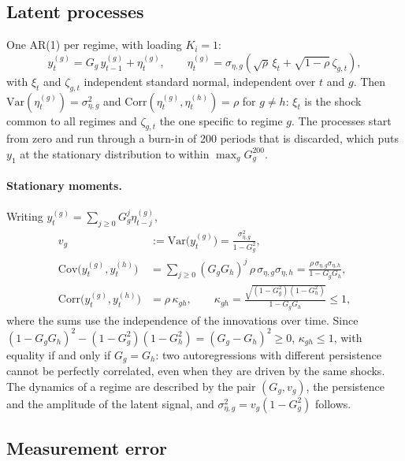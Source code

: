 \documentclass[11pt]{article}
\newcommand{\Var}{\mathrm{Var}}
\newcommand{\Cov}{\mathrm{Cov}}
\newcommand{\Corr}{\mathrm{Corr}}
\begin{document}
\subsection{Latent processes}

One AR(1) per regime, with loading $K_i = 1$:
\begin{equation}\label{eq:latent}
  y^{(g)}_t = G_g\, y^{(g)}_{t-1} + \eta^{(g)}_t, \qquad
  \eta^{(g)}_t = \sigma_{\eta,g}\left(\sqrt{\rho}\,\xi_t + \sqrt{1-\rho}\,\zeta_{g,t}\right),
\end{equation}
with $\xi_t$ and $\zeta_{g,t}$ independent standard normal, independent over $t$ and $g$. Then $\Var(\eta^{(g)}_t) = \sigma^2_{\eta,g}$ and $\Corr(\eta^{(g)}_t, \eta^{(h)}_t) = \rho$ for $g \neq h$: $\xi_t$ is the shock common to all regimes and $\zeta_{g,t}$ the one specific to regime $g$. The processes start from zero and run through a burn-in of 200 periods that is discarded, which puts $y_1$ at the stationary distribution to within $\max_g G_g^{200}$.

\paragraph{Stationary moments.} Writing $y^{(g)}_t = \sum_{j \ge 0} G_g^j \eta^{(g)}_{t-j}$,
\begin{align}
  v_g &:= \Var\bigl(y^{(g)}_t\bigr) = \frac{\sigma^2_{\eta,g}}{1 - G_g^2}, \label{eq:vg}\\
  \Cov\bigl(y^{(g)}_t, y^{(h)}_t\bigr) &= \sum_{j\ge0} (G_gG_h)^j\, \rho\,\sigma_{\eta,g}\sigma_{\eta,h}
     = \frac{\rho\,\sigma_{\eta,g}\sigma_{\eta,h}}{1 - G_gG_h}, \label{eq:cross}\\
  \Corr\bigl(y^{(g)}_t, y^{(h)}_t\bigr) &= \rho\,\kappa_{gh}, \qquad
     \kappa_{gh} = \frac{\sqrt{(1-G_g^2)(1-G_h^2)}}{1 - G_gG_h} \le 1, \label{eq:kappa}
\end{align}
where the sums use the independence of the innovations over time. Since $(1 - G_gG_h)^2 - (1-G_g^2)(1-G_h^2) = (G_g - G_h)^2 \ge 0$, $\kappa_{gh} \le 1$, with equality if and only if $G_g = G_h$: two autoregressions with different persistence cannot be perfectly correlated, even when they are driven by the same shocks. The dynamics of a regime are described by the pair $(G_g, v_g)$, the persistence and the amplitude of the latent signal, and $\sigma^2_{\eta,g} = v_g(1 - G_g^2)$ follows.

\subsection{Measurement error}
\end{document}
